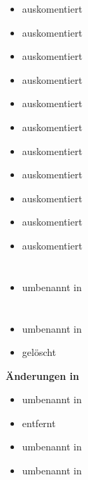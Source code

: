 \begin{itemize}
   \item {} auskomentiert
   \item {} auskomentiert
   \item {} auskomentiert
   \item {} auskomentiert
   \item {} auskomentiert
   \item {} auskomentiert
   \item {} auskomentiert
   \item {} auskomentiert
   \item {} auskomentiert
   \item {} auskomentiert
   \item {} auskomentiert
   
\end{itemize}



\section{}
\begin{itemize}
	\item {} umbenannt in 
\end{itemize}



\section{}
\begin{itemize}
	\item {} umbenannt in 
	\item {} gelöscht
\end{itemize}

\textbf{Änderungen in }
\begin{itemize}
	\item {} umbenannt in 
	\item {} entfernt
	\item {} umbenannt in 
	\item {} umbenannt in 
\end{itemize}



